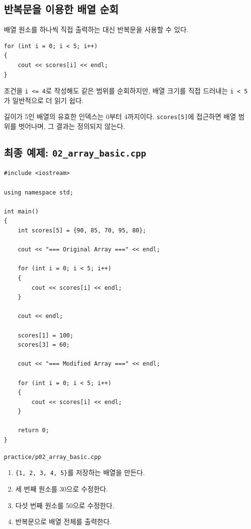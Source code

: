 \documentclass[11pt,a4paper]{article}
\begin{document}
\subsection{반복문을 이용한 배열 순회}

배열 원소를 하나씩 직접 출력하는 대신 반복문을 사용할 수 있다.

\begin{lstlisting}
for (int i = 0; i < 5; i++)
{
    cout << scores[i] << endl;
}
\end{lstlisting}

조건을 \texttt{i <= 4}로 작성해도 같은 범위를 순회하지만, 배열 크기를 직접 드러내는 \texttt{i < 5}가 일반적으로 더 읽기 쉽다.

\begin{importantbox}
길이가 5인 배열의 유효한 인덱스는 0부터 4까지이다. \texttt{scores[5]}에 접근하면 배열 범위를 벗어나며, 그 결과는 정의되지 않는다.
\end{importantbox}

\subsection{최종 예제: \texttt{02\_array\_basic.cpp}}

\begin{lstlisting}
#include <iostream>

using namespace std;

int main()
{
    int scores[5] = {90, 85, 70, 95, 80};

    cout << "=== Original Array ===" << endl;

    for (int i = 0; i < 5; i++)
    {
        cout << scores[i] << endl;
    }

    cout << endl;

    scores[1] = 100;
    scores[3] = 60;

    cout << "=== Modified Array ===" << endl;

    for (int i = 0; i < 5; i++)
    {
        cout << scores[i] << endl;
    }

    return 0;
}
\end{lstlisting}

\begin{practicebox}
\texttt{practice/p02\_array\_basic.cpp}
\begin{enumerate}[leftmargin=1.5em]
    \item \texttt{\{1, 2, 3, 4, 5\}}를 저장하는 배열을 만든다.
    \item 세 번째 원소를 30으로 수정한다.
    \item 다섯 번째 원소를 50으로 수정한다.
    \item 반복문으로 배열 전체를 출력한다.
\end{enumerate}
\end{practicebox}
\end{document}
